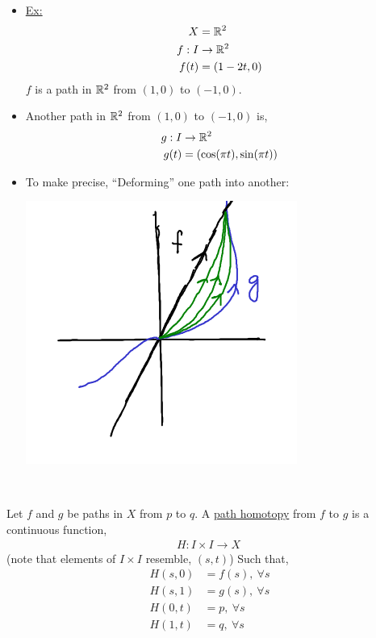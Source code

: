 \documentclass[../notes.tex]{subfiles}
\begin{document}
    \begin{itemize}
        \item \underline{Ex:}
            \begin{align*}
                X&=\mathbb{R}^2\\
                f: I &\rightarrow\mathbb{R}^2\\
                f(t)&=(1-2t,0)\\
            \end{align*}
            $f$ is a path in $\mathbb{R}^2$ from $(1,0)$ to $(-1,0)$.
        \item Another path in $\mathbb{R}^2$ from $(1,0)$ to $(-1,0)$ is,
            \begin{align*}
                g: I &\rightarrow \mathbb{R}^2\\
                g(t)&=(\cos(\pi t),\sin(\pi t))\\
            \end{align*}
        \item To make precise, ``Deforming'' one path into another:\\
            \begin{minipage}[c]{\linewidth}
                \begin{center}
                    \includegraphics[]{images/homotopy_class_2.png}
                \end{center}
            \end{minipage}\\
    \end{itemize}
        \begin{definition}
            Let $f$ and $g$ be paths in $X$ from $p$ to $q$. A \underline{path homotopy} from $f$ to $g$ is a continuous function,
            \begin{align*}
                H: I\times I \rightarrow X\
            \end{align*}
            (note that elements of $I\times I$ resemble, $(s,t)$)
            Such that,
            \begin{align*}
                H(s,0)&=f(s),\ \forall s\\
                H(s,1)&=g(s),\ \forall s\\
                H(0,t)&=p,\ \forall s\\
                H(1,t)&=q,\ \forall s\\
            \end{align*}
        \end{definition}
\end{document}
